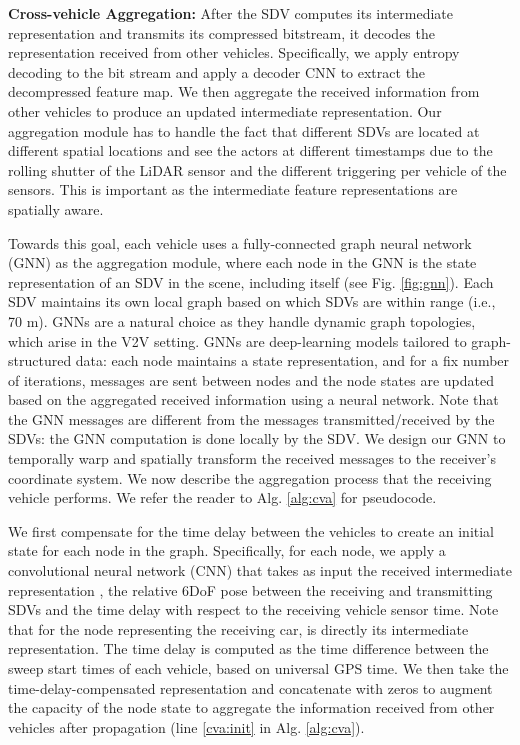 \documentclass[runningheads]{llncs}
\begin{document}
{\flushleft\bf Cross-vehicle Aggregation:}
After the SDV computes its intermediate representation and transmits
its compressed bitstream,
it decodes the representation received from other vehicles.
Specifically, we apply entropy decoding to the bit stream and apply a decoder CNN to extract the decompressed feature map.
We then aggregate the received information from other vehicles to
produce an updated intermediate representation.
Our aggregation module has to handle the fact that different SDVs are located at different spatial locations and see the actors at different timestamps due to the rolling shutter of the LiDAR sensor and the different triggering per vehicle of the sensors.
This is important as the intermediate feature representations are spatially aware.

Towards this goal, each vehicle uses a fully-connected graph neural network (GNN) \cite{schlichtkrull2018modeling} as the aggregation module,
where each node in the GNN is the state representation of an SDV in the scene, including itself (see Fig. \ref{fig:gnn}).
Each SDV maintains its own local graph based on which SDVs are within range (i.e., 70 m). GNNs are a natural choice as they handle dynamic graph topologies, which arise in the V2V setting. 
GNNs are deep-learning models tailored to graph-structured data: each node maintains a state representation, and for a fix number of iterations, messages are sent between nodes and the node states are updated based on the aggregated received information using a neural network.
Note that the GNN messages 
are different from
the messages transmitted/received by the SDVs: the GNN computation is done locally by the SDV.
We design our GNN to temporally warp and spatially transform the received messages to the receiver's coordinate system.
We now describe the aggregation process that 
the receiving vehicle performs. We  refer the reader to  Alg. \ref{alg:cva} for  pseudocode. 

We first compensate for the time delay between the vehicles to create an initial state for each node in the graph.
Specifically,  for each node, we apply a convolutional neural network (CNN) that takes as input the received intermediate representation , the relative 6DoF pose   between the receiving and transmitting SDVs  and the time delay  with respect to the receiving vehicle sensor time. Note that for the node representing the receiving car,  is directly its intermediate representation. 
The time delay is computed as the time difference between the sweep start times of each vehicle, based on universal GPS time.
We then take the time-delay-compensated representation and concatenate with zeros to augment the capacity of the node state
to aggregate the information received from other vehicles after propagation (line \ref{cva:init} in Alg. \ref{alg:cva}).
\end{document}
